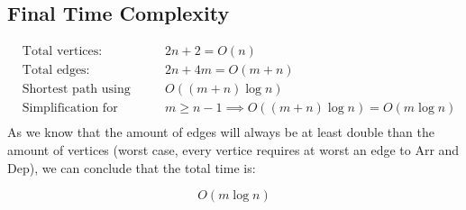 \documentclass[12pt]{article}
\begin{document}
\subsection*{Final Time Complexity}
\[
\begin{aligned}
&\text{Total vertices:} && 2n + 2 = O(n) \\[2mm]
&\text{Total edges:} && 2n + 4m = O(m+n) \\
&\text{Shortest path using Dijkstra:} && O((m+n)\log n) \\
&\text{Simplification for connected graph:} && m \ge n-1 \implies O((m+n)\log n) = O(m \log n) \\[1mm]
\end{aligned}
\]
As we know that the amount of edges will always be at least double than the amount of vertices (worst case, every vertice requires at worst an edge to Arr and Dep), we can conclude that the total time is:

\[
\boxed{O(m \log n)}
\]
\end{document}
